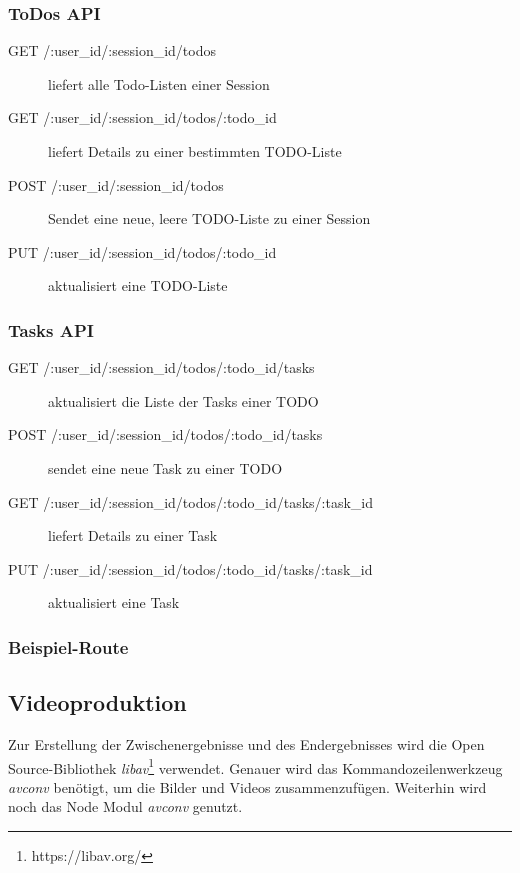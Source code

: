 \subsubsection{ToDos API}

\begin{description}

	\item[GET /:user\_id/:session\_id/todos] liefert alle Todo-Listen einer Session	
	\item[GET /:user\_id/:session\_id/todos/:todo\_id] liefert Details zu einer bestimmten TODO-Liste	
	\item[POST /:user\_id/:session\_id/todos] Sendet eine neue, leere TODO-Liste zu einer Session
	
	\item[PUT /:user\_id/:session\_id/todos/:todo\_id] aktualisiert eine TODO-Liste
	
\end{description}

\subsubsection{Tasks API}

\begin{description}

	\item[GET /:user\_id/:session\_id/todos/:todo\_id/tasks] aktualisiert die Liste der Tasks einer TODO	
	\item[POST /:user\_id/:session\_id/todos/:todo\_id/tasks] sendet eine neue Task zu einer TODO
	
	\item[GET /:user\_id/:session\_id/todos/:todo\_id/tasks/:task\_id] liefert Details zu einer Task
	
	\item[PUT /:user\_id/:session\_id/todos/:todo\_id/tasks/:task\_id] aktualisiert eine Task
	  
\end{description}

\subsubsection{Beispiel-Route}
\subsection{Videoproduktion}

Zur Erstellung der Zwischenergebnisse und des Endergebnisses wird die Open Source-Bibliothek \emph{libav}\footnote{https://libav.org/} verwendet. Genauer wird das Kommandozeilenwerkzeug \textit{avconv} benötigt, um die Bilder und Videos zusammenzufügen. Weiterhin wird noch das Node Modul \emph{avconv} genutzt. 

